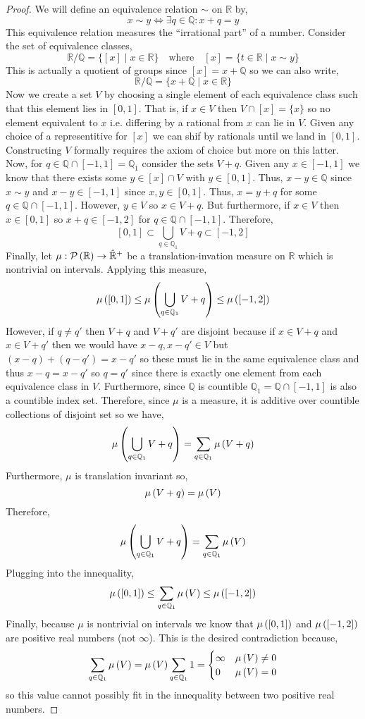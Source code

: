 \documentclass{article}
\newcommand{\Q}{\mathbb{Q}}
\newcommand{\R}{\mathbb{R}}
\theoremstyle{theorem}
\theoremstyle{definition}
\theoremstyle{definition}
\theoremstyle{remark}
\theoremstyle{definition}
\theoremstyle{remark}
\begin{document}
\begin{proof}
We will define an equivalence relation $\sim$ on $\R$ by,
\[ x \sim y \iff \exists q \in \Q : x + q = y \]
This equivalence relation measures the ``irrational part'' of a number. Consider the set of equivalence classes,
\[ \R / \Q = \{ [x] \mid x \in \R \} \quad \text{where} \quad [x] = \{t \in \R \mid x \sim y \} \]
This is actually a quotient of groups since $[x] = x + \Q$ so we can also write,
\[ \R / \Q = \{ x + \Q \mid x \in \R \} \]
Now we create a set $V$ by choosing a single element of each equivalence class such that this element lies in $[0,1]$. That is, if $x \in V$ then $V \cap [x] = \{x\}$ so no element equivalent to $x$ i.e. differing by a rational from $x$ can lie in $V$. Given any choice of a representitive for $[x]$ we can shif by rationals until we land in $[0, 1]$. Constructing $V$ formally requires the axiom of choice but more on this latter. 
\bigskip\\
Now, for $q \in \Q \cap [-1, 1] = \Q_{1}$ consider the sets $V + q$. Given any $x \in [-1, 1]$ we know that there exists some $y \in [x] \cap V$ with $y \in [0, 1]$. Thus, $x - y \in \Q$ since $x \sim y$ and $x - y \in [-1, 1]$ since $x,y \in [0, 1]$. Thus, $x = y + q$ for some $q \in \Q \cap [-1,1]$. However, $y \in V$ so $x \in V + q$. But furthermore, if $x \in V$ then $x \in [0, 1]$ so $x + q \in [-1, 2]$ for $q \in \Q \cap [-1,1]$. Therefore,
\[ [0, 1] \subset \bigcup_{q \in \Q_{1}} V + q \subset [-1, 2] \]
Finally, let $\mu : \Power{\R} \to \Rcomp$ be a translation-invation measure on $\R$ which is nontrivial on intervals. Applying this measure,
\[ \measure{[0, 1]} \le \measure{\bigcup_{q \in \Q_{1}} V + q} \le \measure{[-1,2]} \]
However, if $q \neq q'$ then $V + q$ and $V + q'$ are disjoint because if $x \in V + q$ and $x \in V + q'$ then we would have $x - q, x - q' \in V$ but $(x - q) + (q - q') = x - q'$ so these must lie in the same equivalence class and thus $x - q = x - q'$ so $q = q'$ since there is exactly one element from each equivalence class in $V$. Furthermore, since $\Q$ is countible $\Q_1 = \Q \cap [-1,1]$ is also a countible index set. Therefore, since $\mu$ is a measure, it is additive over countible collections of disjoint set so we have,
\[ \measure{\bigcup_{q \in \Q_{1}} V + q} = \sum_{q \in \Q_{1}} \measure{V + q} \]
Furthermore, $\mu$ is translation invariant so,
\[ \mu\left( V + q \right) = \mu\left( V \right) \]
Therefore,
\[ \measure{\bigcup_{q \in \Q_{1}} V + q} = \sum_{q \in \Q_{1}} \measure{V} \]
Plugging into the innequality,
\[ \measure{[0, 1]} \le \sum_{q \in \Q_{1}} \measure{V} \le \measure{[-1,2]} \]
Finally, because $\mu$ is nontrivial on intervals we know that $\mu\left( [0,1] \right)$ and $\mu\left( [-1,2] \right)$ are positive real numbers (not $\infty$). This is the desired contradiction because,
\[ \sum_{q \in \Q_{1}} \measure{V} = \measure{V} \sum_{q \in \Q_1} 1 
= 
\begin{cases}
\infty & \measure{V} \neq 0
\\
0 & \measure{V} = 0
\end{cases}\] 
so this value cannot possibly fit in the innequality between two positive real numbers. 
\end{proof}
\end{document}

